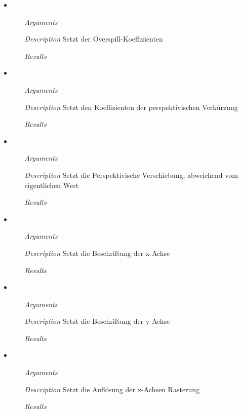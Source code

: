 \begin{itemize}
\item {}
\begin{enumerate}
\item[\textit{Arguments}] 
\item[\textit{Description}] Setzt der Overspill-Koeffizienten
\item[\textit{Results}] 
\end{enumerate}

\item {}
\begin{enumerate}
\item[\textit{Arguments}] 
\item[\textit{Description}] Setzt den Koeffizienten der
  perspektivischen Verk\"urzung
\item[\textit{Results}] 
\end{enumerate}

\item {}
\begin{enumerate}
\item[\textit{Arguments}] 
\item[\textit{Description}] Setzt die Perspektivische Verschiebung,
  abweichend vom eigentlichen Wert
\item[\textit{Results}] 
\end{enumerate}

\item {}
\begin{enumerate}
\item[\textit{Arguments}] 
\item[\textit{Description}] Setzt die Beschriftung der x-Achse
\item[\textit{Results}] 
\end{enumerate}

\item {}
\begin{enumerate}
\item[\textit{Arguments}] 
\item[\textit{Description}] Setzt die Beschriftung der y-Achse
\item[\textit{Results}] 
\end{enumerate}

\item {}
\begin{enumerate}
\item[\textit{Arguments}] 
\item[\textit{Description}] Setzt die Aufl\"osung der x-Achsen
  Rasterung
\item[\textit{Results}] 
\end{enumerate}


\end{itemize}
